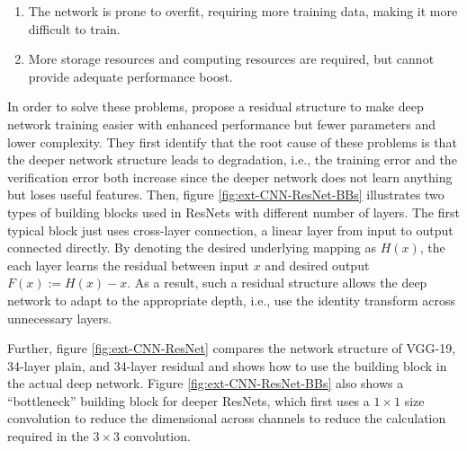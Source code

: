 \begin{enumerate}
    \item The network is prone to overfit, requiring more training data, making it more difficult to train.
    \item More storage resources and computing resources are required, but cannot provide adequate performance boost. 
\end{enumerate}

In order to solve these problems, \citet{he2015deep} propose a residual structure to make deep network training easier with enhanced performance but fewer parameters and lower complexity. 
They first identify that the root cause of these problems is that the deeper network structure leads to degradation, i.e., the training error and the verification error both increase since the deeper network does not learn anything but loses useful features.
Then, figure \ref{fig:ext-CNN-ResNet-BBs} illustrates two types of building blocks used in ResNets with different number of layers.
The first typical block just uses cross-layer connection, a linear layer from input to output connected directly.
By denoting the desired underlying mapping as $H(x)$, the each layer learns the residual between input $x$ and desired output $F(x):=H(x)-x$.
As a result, such a residual structure allows the deep network to adapt to the appropriate depth, i.e., use the identity transform across unnecessary layers.

Further, figure \ref{fig:ext-CNN-ResNet} compares the network structure of VGG-19, 34-layer plain, and 34-layer residual and shows how to use the building block in the actual deep network. Figure \ref{fig:ext-CNN-ResNet-BBs} also shows a ``bottleneck'' building block for deeper ResNets, which first uses a $1\times1$ size convolution to reduce the dimensional across channels to reduce the calculation required in the $3\times3$ convolution.

